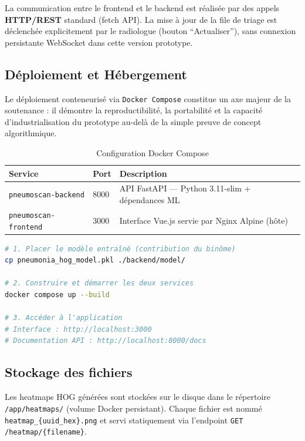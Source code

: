 \documentclass[12pt, a4paper]{report}
\begin{document}
La communication entre le frontend et le backend est réalisée par des appels
\textbf{HTTP/REST} standard (fetch API). La mise à jour de la file de triage
est déclenchée explicitement par le radiologue (bouton ``Actualiser''),
sans connexion persistante WebSocket dans cette version prototype.

\subsection{Déploiement et Hébergement}

\begin{infobox}
Le déploiement conteneurisé via \texttt{Docker Compose} constitue un axe majeur
de la soutenance : il démontre la reproductibilité, la portabilité et la capacité
d'industrialisation du prototype au-delà de la simple preuve de concept algorithmique.
\end{infobox}

\begin{table}[H]
\centering
\caption{Configuration Docker Compose}
\begin{tabularx}{\textwidth}{L{3.5cm} L{2cm} X}
\toprule
\textbf{Service} & \textbf{Port} & \textbf{Description} \\
\midrule
\texttt{pneumoscan-backend}  & 8000 & API FastAPI --- Python 3.11-slim + dépendances ML \\
\texttt{pneumoscan-frontend} & 3000 & Interface Vue.js servie par Nginx Alpine (hôte) \\
\bottomrule
\end{tabularx}
\end{table}

\begin{lstlisting}[language=bash, caption={Déploiement en trois commandes}]
# 1. Placer le modèle entraîné (contribution du binôme)
cp pneumonia_hog_model.pkl ./backend/model/

# 2. Construire et démarrer les deux services
docker compose up --build

# 3. Accéder à l'application
# Interface : http://localhost:3000
# Documentation API : http://localhost:8000/docs
\end{lstlisting}

\subsection{Stockage des fichiers}

Les heatmaps HOG générées sont stockées sur le disque dans le répertoire
\texttt{/app/heatmaps/} (volume Docker persistant). Chaque fichier est nommé
\texttt{heatmap\_\{uuid\_hex\}.png} et servi statiquement via l'endpoint
\texttt{GET /heatmap/\{filename\}}.
\end{document}
